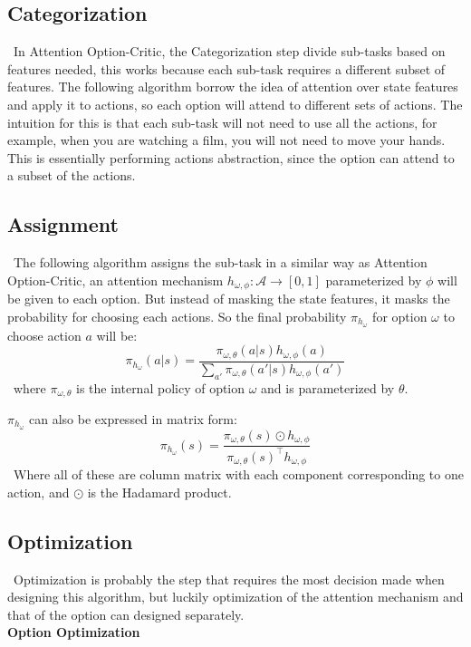 \documentclass{article}
\begin{document}
	\subsection*{Categorization}
	\qquad \ In Attention Option-Critic, the Categorization step divide sub-tasks based on features needed, this works because each sub-task requires a different subset of features. The following algorithm borrow the idea of attention over state features and apply it to actions, so each option will attend to different sets of actions. The intuition for this is that each sub-task will not need to use all the actions, for example, when you are watching a film, you will not need to move your hands. This is essentially performing actions abstraction, since the option can attend to a subset of the actions.
	\subsection*{Assignment}
	\qquad \ The following algorithm assigns the sub-task in a similar way as Attention Option-Critic, an attention mechanism $h_{\omega,\phi}:\mathcal{A} \rightarrow [0,1]$ parameterized by $\phi$ will be given to each option. But instead of masking the state features, it masks the probability for choosing each actions. So the final probability $\pi_{h_\omega}$ for option $\omega$ to choose action $a$ will be: $$\pi_{h_\omega}(a|s) = \frac{\pi_{\omega,\theta}(a|s)h_{\omega, \phi}(a)}{\sum_{a'} \pi_{\omega,\theta}(a'|s)h_{\omega, \phi}(a')}$$ \qquad \ where $\pi_{\omega,\theta}$ is the internal policy of option $\omega$ and is parameterized by $\theta$.
	
	\quad $\pi_{h_\omega}$ can also be expressed in matrix form: $$\pi_{h_\omega}(s) = \frac{\pi_{\omega,\theta}(s)\odot h_{\omega, \phi}}{\pi_{\omega,\theta}(s)^\intercal h_{\omega, \phi}}$$ \qquad \ Where all of these are column matrix with each component corresponding to one action, and $\odot$ is the Hadamard product.
	\subsection*{Optimization}
	\qquad \ Optimization is probably the step that requires the most decision made when designing this algorithm, but luckily optimization of the attention mechanism and that of the option can designed separately.\vspace{0.2in}\\
	{\bfseries Option Optimization}\vspace{0.05in}
	
\end{document}
